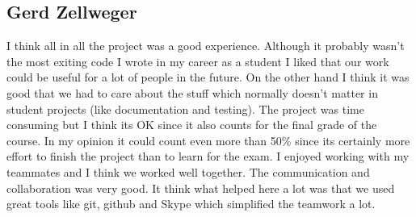 \subsection{Gerd Zellweger}
\label{individual:gerd}
I think all in all the project was a good experience. Although it probably wasn't the most exiting code I wrote in my career as a student I liked that our work could be useful for a lot of people in the future. On the other hand I think it was good that we had to care about the stuff which normally doesn't matter in student projects (like documentation and testing). The project was time consuming but I think its OK since it also counts for the final grade of the course. In my opinion it could count even more than 50\% since its certainly more effort to finish the project than to learn for the exam.
I enjoyed working with my teammates and I think we worked well together. The communication and collaboration was very good. It think what helped here a lot was that we used great tools like git, github and Skype which simplified the teamwork a lot.
